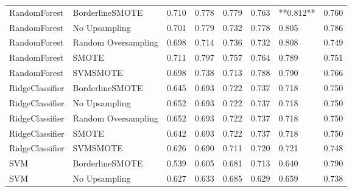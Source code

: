 \begin{tabular}{llllllll}
                RandomForest &     BorderlineSMOTE & 0.710 &                     0.778 &                 0.779 &                  0.763 &                               **0.812** &    0.760 \\
                RandomForest &       No Upsampling & 0.701 &                     0.779 &                 0.732 &                  0.778 &                                   0.805 &    0.786 \\
                RandomForest & Random Oversampling & 0.698 &                     0.714 &                 0.736 &                  0.732 &                                   0.808 &    0.749 \\
                RandomForest &               SMOTE & 0.711 &                     0.797 &                 0.757 &                  0.764 &                                   0.789 &    0.751 \\
                RandomForest &            SVMSMOTE & 0.698 &                     0.738 &                 0.713 &                  0.788 &                                   0.790 &    0.766 \\
             RidgeClassifier &     BorderlineSMOTE & 0.645 &                     0.693 &                 0.722 &                  0.737 &                                   0.718 &    0.750 \\
             RidgeClassifier &       No Upsampling & 0.652 &                     0.693 &                 0.722 &                  0.737 &                                   0.718 &    0.750 \\
             RidgeClassifier & Random Oversampling & 0.652 &                     0.693 &                 0.722 &                  0.737 &                                   0.718 &    0.750 \\
             RidgeClassifier &               SMOTE & 0.642 &                     0.693 &                 0.722 &                  0.737 &                                   0.718 &    0.750 \\
             RidgeClassifier &            SVMSMOTE & 0.626 &                     0.690 &                 0.711 &                  0.720 &                                   0.721 &    0.748 \\
                         SVM &     BorderlineSMOTE & 0.539 &                     0.605 &                 0.681 &                  0.713 &                                   0.640 &    0.790 \\
                         SVM &       No Upsampling & 0.627 &                     0.633 &                 0.685 &                  0.629 &                                   0.659 &    0.738 \\

\end{tabular}
